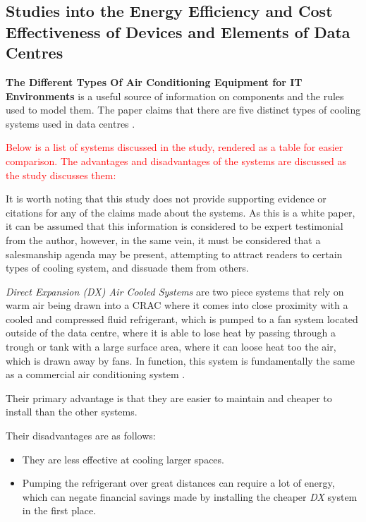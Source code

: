 \subsection{Studies into the Energy Efficiency and Cost Effectiveness of Devices and Elements of Data Centres}
\label{sec:ACriticalReviewOfReleventScientificAndEngineeringLiturature:StudiesIntoTheEnvironmentalEffectsAndEnergyEffiencyOfDataCenters}

\textbf{The Different Types Of Air Conditioning Equipment for IT Environments}  \cite{TonyEvansTheDifferentTypesOfAirConditioningEquipmentForITEnvironmentsWhitePaper} is a useful source of information on components and the rules used to model them. The paper claims that there are five distinct types of cooling systems used in \gls{data centre}s \cite[The 5 basic IT environment heat removal methods]{ TonyEvansTheDifferentTypesOfAirConditioningEquipmentForITEnvironmentsWhitePaper}.

\textcolor{red}{Below is a list of systems discussed in the study, rendered as a table for easier comparison. The advantages and disadvantages of the systems are discussed as the study discusses them:}

It is worth noting that this study does not provide supporting evidence or citations for any of the claims made about the systems. As this is a white paper, it can be assumed that this information is considered to be expert testimonial from the author, however, in the same vein, it must be considered that a salesmanship agenda may be present, attempting to attract readers to certain types of cooling system, and dissuade them from others.

\emph{Direct Expansion (DX) Air Cooled Systems}  are two piece systems that rely on warm air being drawn into a \gls{CRAC} where it comes into close proximity with a cooled and compressed fluid refrigerant, which is pumped to a fan system located outside of the \gls{data centre}, where it is able to lose heat by passing through a trough or tank with a large surface area, where it can loose heat too the air, which is drawn away by fans. In function, this system is fundamentally the same as a commercial air conditioning system \cite{ DataCenterHuddleCRACVsCRAHDefinition}.
   
Their primary advantage is that they are easier to maintain and cheaper to install than the other systems.

Their disadvantages are as follows:

\begin{itemize}
\item They are less effective at cooling larger spaces.
   
\item Pumping the refrigerant over great distances can require a lot of energy, which can negate financial savings made by installing the cheaper \emph{DX} system in the first place.
\end{itemize}

